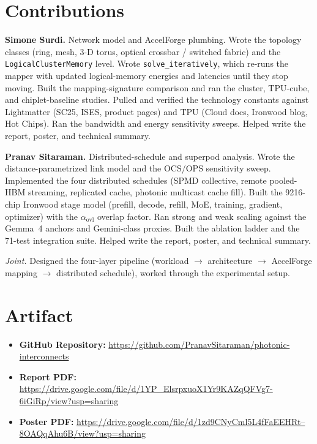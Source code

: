 \documentclass[conference,onecolumn]{IEEEtran}
\begin{document}
\section{Contributions}
\textbf{Simone Surdi.} Network model and AccelForge plumbing. Wrote
the topology classes (ring, mesh, 3-D torus, optical crossbar /
switched fabric) and the \texttt{LogicalClusterMemory} level.
Wrote \texttt{solve\_iteratively}, which re-runs the mapper with
updated logical-memory energies and latencies until they stop
moving. Built the mapping-signature comparison and ran the cluster,
TPU-cube, and chiplet-baseline studies. Pulled and verified the
technology constants against Lightmatter (SC25, ISES, product
pages) and TPU (Cloud docs, Ironwood blog, Hot Chips). Ran the
bandwidth and energy sensitivity sweeps. Helped write the report, poster, and technical summary.
 
\textbf{Pranav Sitaraman.} Distributed-schedule and superpod
analysis. Wrote the distance-parametrized link model and the OCS/OPS
sensitivity sweep. Implemented the four distributed schedules (SPMD
collective, remote pooled-HBM streaming, replicated cache, photonic
multicast cache fill). Built the 9216-chip Ironwood stage model
(prefill, decode, refill, MoE, training, gradient, optimizer) with
the $\alpha_\text{ovl}$ overlap factor. Ran strong and weak scaling
against the Gemma~4 anchors and Gemini-class proxies. Built the
ablation ladder and the 71-test integration suite. Helped write the report,
poster, and technical summary.
 
\smallskip
\noindent\emph{Joint.} Designed the four-layer pipeline (workload
$\to$ architecture $\to$ AccelForge mapping $\to$ distributed
schedule), worked through the experimental setup.
 
 
\section{Artifact}
\begin{itemize}
    \item \textbf{GitHub Repository:} \href{https://github.com/PranavSitaraman/photonic-interconnects}{https://github.com/PranavSitaraman/photonic-interconnects}
    \item \textbf{Report PDF:} \href{https://drive.google.com/file/d/1YP_ElsrpxuoX1Yr9KAZqQFVg7-6iGiRp/view?usp=sharing}{https://drive.google.com/file/d/1YP\_ElsrpxuoX1Yr9KAZqQFVg7-6iGiRp/view?usp=sharing}
    \item \textbf{Poster PDF:} \href{https://drive.google.com/file/d/1zd9CNyCml5L4fFaEEHRt--8OAQqAhu6B/view?usp=sharing}{https://drive.google.com/file/d/1zd9CNyCml5L4fFaEEHRt--8OAQqAhu6B/view?usp=sharing}
\end{itemize}
 
\end{document}

